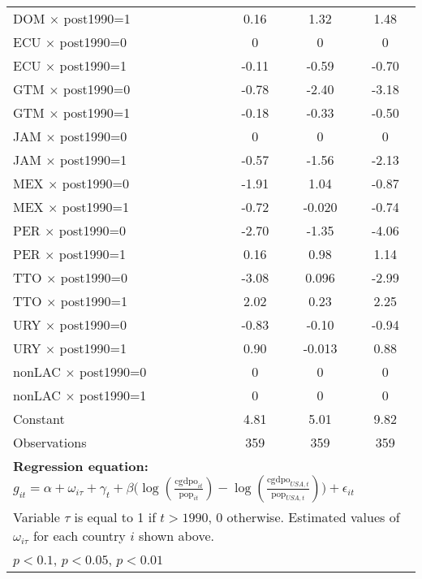 \begin{sidewaystable}[htbp]
\begin{tabular}{l*{3}{c}}
DOM $\times$ post1990=1&     0.16         &     1.32\sym{***}&     1.48\sym{***}\\
ECU $\times$ post1990=0&        0         &        0         &        0         \\
ECU $\times$ post1990=1&    -0.11         &    -0.59\sym{**} &    -0.70\sym{***}\\
GTM $\times$ post1990=0&    -0.78\sym{***}&    -2.40\sym{***}&    -3.18\sym{***}\\
GTM $\times$ post1990=1&    -0.18         &    -0.33         &    -0.50\sym{*}  \\
JAM $\times$ post1990=0&        0         &        0         &        0         \\
JAM $\times$ post1990=1&    -0.57\sym{***}&    -1.56\sym{***}&    -2.13\sym{***}\\
MEX $\times$ post1990=0&    -1.91\sym{***}&     1.04\sym{***}&    -0.87\sym{**} \\
MEX $\times$ post1990=1&    -0.72\sym{***}&   -0.020         &    -0.74\sym{***}\\
PER $\times$ post1990=0&    -2.70\sym{***}&    -1.35\sym{***}&    -4.06\sym{***}\\
PER $\times$ post1990=1&     0.16         &     0.98\sym{***}&     1.14\sym{***}\\
TTO $\times$ post1990=0&    -3.08\sym{***}&    0.096         &    -2.99\sym{***}\\
TTO $\times$ post1990=1&     2.02\sym{***}&     0.23         &     2.25\sym{***}\\
URY $\times$ post1990=0&    -0.83\sym{***}&    -0.10         &    -0.94\sym{**} \\
URY $\times$ post1990=1&     0.90\sym{***}&   -0.013         &     0.88\sym{***}\\
nonLAC $\times$ post1990=0&        0         &        0         &        0         \\
nonLAC $\times$ post1990=1&        0         &        0         &        0         \\
Constant        &     4.81\sym{*}  &     5.01         &     9.82\sym{**} \\
\midrule
Observations    &      359         &      359         &      359         \\
\bottomrule
\multicolumn{4}{l}{\footnotesize \textbf{Regression equation:} \(g_{it} = \alpha + \omega_{i\tau} + \gamma_t + \beta \big(\log (\frac{\textrm{cgdpo}_{it}}{\textrm{pop}_{it}} ) - \log (\frac{\textrm{cgdpo}_{USA,t}}{\textrm{pop}_{USA,t}}  ) \big) + \epsilon_{it}\)}\\
\multicolumn{4}{l}{\footnotesize Variable \(\tau\) is equal to 1 if \(t > 1990\), 0 otherwise. Estimated values of \(\omega_{i\tau}\) for each country \(i\) shown above.}\\
\multicolumn{4}{l}{\footnotesize \sym{*} \(p<0.1\), \sym{**} \(p<0.05\), \sym{***} \(p<0.01\)}\\
\end{tabular}
\end{sidewaystable}
